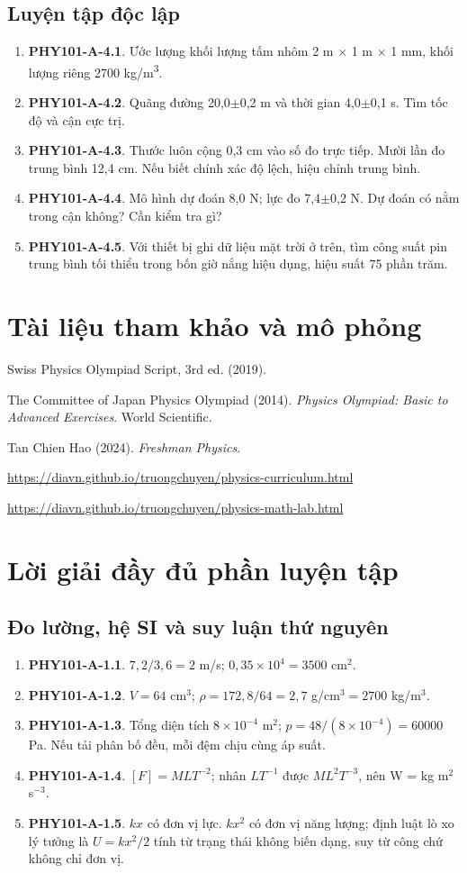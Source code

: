 \documentclass[11pt,a4paper,openany]{book}
\begin{document}
\section{Luyện tập độc lập}
\begin{enumerate}
\item \textbf{PHY101-A-4.1}. Ước lượng khối lượng tấm nhôm 2 m \ensuremath{\times} 1 m \ensuremath{\times} 1 mm, khối lượng riêng 2700 kg/m\textsuperscript{3}.
\item \textbf{PHY101-A-4.2}. Quãng đường 20,0\ensuremath{\pm}0,2 m và thời gian 4,0\ensuremath{\pm}0,1 s. Tìm tốc độ và cận cực trị.
\item \textbf{PHY101-A-4.3}. Thước luôn cộng 0,3 cm vào số đo trực tiếp. Mười lần đo trung bình 12,4 cm. Nếu biết chính xác độ lệch, hiệu chỉnh trung bình.
\item \textbf{PHY101-A-4.4}. Mô hình dự đoán 8,0 N; lực đo 7,4\ensuremath{\pm}0,2 N. Dự đoán có nằm trong cận không? Cần kiểm tra gì?
\item \textbf{PHY101-A-4.5}. Với thiết bị ghi dữ liệu mặt trời ở trên, tìm công suất pin trung bình tối thiểu trong bốn giờ nắng hiệu dụng, hiệu suất 75 phần trăm.
\end{enumerate}
\chapter*{Tài liệu tham khảo và mô phỏng}
Swiss Physics Olympiad Script, 3rd ed. (2019).\par
The Committee of Japan Physics Olympiad (2014). \textit{Physics Olympiad: Basic to Advanced Exercises}. World Scientific.\par
Tan Chien Hao (2024). \textit{Freshman Physics}.\par
\url{https://diavn.github.io/truongchuyen/physics-curriculum.html}\par
\url{https://diavn.github.io/truongchuyen/physics-math-lab.html}
\appendix
\chapter{Lời giải đầy đủ phần luyện tập}
\section{Đo lường, hệ SI và suy luận thứ nguyên}
\begin{enumerate}
\item \textbf{PHY101-A-1.1}. $7{,}2/3{,}6=2$ m/s; $0{,}35\times10^4=3500$ cm$^2$.
\item \textbf{PHY101-A-1.2}. $V=64$ cm$^3$; $\rho=172{,}8/64=2{,}7$ g/cm$^3=2700$ kg/m$^3$.
\item \textbf{PHY101-A-1.3}. Tổng diện tích $8\times10^{-4}$ m$^2$; $p=48/(8\times10^{-4})=60000$ Pa. Nếu tải phân bố đều, mỗi đệm chịu cùng áp suất.
\item \textbf{PHY101-A-1.4}. $[F]=MLT^{-2}$; nhân $LT^{-1}$ được $ML^2T^{-3}$, nên W = kg m$^2$ s$^{-3}$.
\item \textbf{PHY101-A-1.5}. $kx$ có đơn vị lực. $kx^2$ có đơn vị năng lượng; định luật lò xo lý tưởng là $U=kx^2/2$ tính từ trạng thái không biến dạng, suy từ công chứ không chỉ đơn vị.
\end{enumerate}
\end{document}
